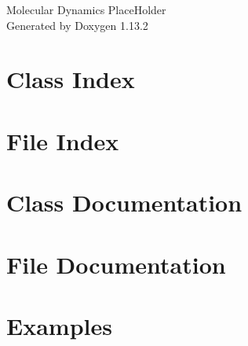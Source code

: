 \documentclass[twoside]{book}
\newcommand{\+}{\discretionary{\mbox{\scriptsize$\hookleftarrow$}}{}{}}
\newcommand{\clearemptydoublepage}{%
    \newpage{\pagestyle{empty}\cleardoublepage}%
  }
\begin{document}
  \raggedbottom
    \hypersetup{pageanchor=false,
                bookmarksnumbered=true,
                pdfencoding=unicode
               }
  \begin{titlepage}
  \vspace*{7cm}
  \begin{center}%
  {\Large Molecular Dynamics Place\+Holder}\\
  \vspace*{1cm}
  {\large Generated by Doxygen 1.13.2}\\
  \end{center}
  \end{titlepage}
  \clearemptydoublepage
  \tableofcontents
  \clearemptydoublepage
  \hypersetup{pageanchor=true}
\chapter{Class Index}

\chapter{File Index}

\chapter{Class Documentation}





\chapter{File Documentation}





\chapter{Examples}

  \backmatter
  \newpage
  \clearemptydoublepage
  \printindex
\end{document}
